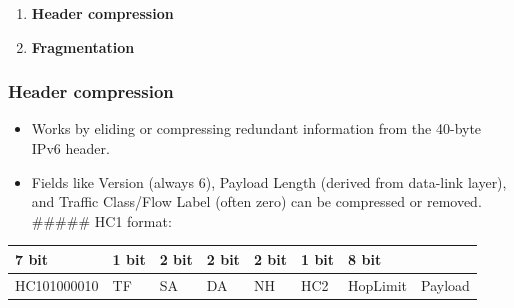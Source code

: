 \documentclass[a4paper, 12pt]{book} %
\begin{document}
\begin{enumerate}
\def\labelenumi{\arabic{enumi}.}
\tightlist
\item
  \textbf{Header compression}
\item
  \textbf{Fragmentation}
\end{enumerate}

\subsubsection{Header compression}\label{header-compression}

\begin{itemize}
\tightlist
\item
  Works by eliding or compressing redundant information from the 40-byte
  IPv6 header.
\item
  Fields like Version (always 6), Payload Length (derived from data-link
  layer), and Traffic Class/Flow Label (often zero) can be compressed or
  removed. \#\#\#\#\# HC1 format:
\end{itemize}

\begin{longtable}[]{@{}
  >{\raggedright\arraybackslash}p{}
  >{\raggedright\arraybackslash}p{}
  >{\raggedright\arraybackslash}p{}
  >{\raggedright\arraybackslash}p{}
  >{\raggedright\arraybackslash}p{}
  >{\raggedright\arraybackslash}p{}
  >{\raggedright\arraybackslash}p{}
  >{\raggedright\arraybackslash}p{}@{}}
\toprule\noalign{}
\begin{minipage}[b]{\linewidth}\raggedright
7 bit
\end{minipage} & \begin{minipage}[b]{\linewidth}\raggedright
1 bit
\end{minipage} & \begin{minipage}[b]{\linewidth}\raggedright
2 bit
\end{minipage} & \begin{minipage}[b]{\linewidth}\raggedright
2 bit
\end{minipage} & \begin{minipage}[b]{\linewidth}\raggedright
2 bit
\end{minipage} & \begin{minipage}[b]{\linewidth}\raggedright
1 bit
\end{minipage} & \begin{minipage}[b]{\linewidth}\raggedright
8 bit
\end{minipage} & \begin{minipage}[b]{\linewidth}\raggedright
\end{minipage} \\
\midrule\noalign{}
\endhead
\bottomrule\noalign{}
\endlastfoot
HC101000010 & TF & SA & DA & NH & HC2 & HopLimit & Payload \\
\end{longtable}
\end{document}
